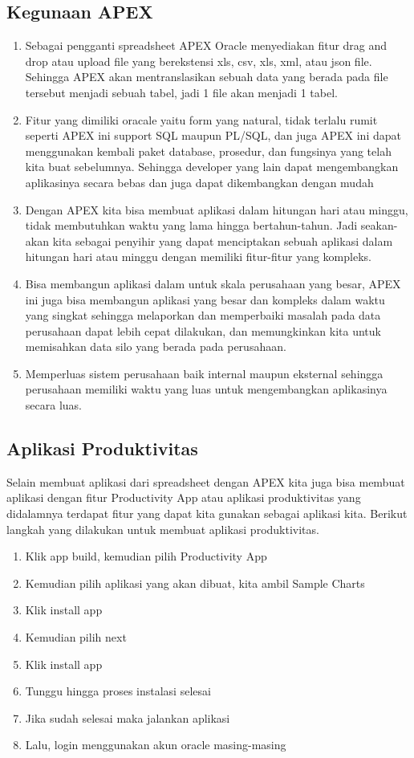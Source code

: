 \subsection{Kegunaan APEX}
\begin{enumerate}
\item Sebagai pengganti spreadsheet APEX Oracle menyediakan fitur drag and drop atau upload file yang berekstensi xls, csv, xls, xml, atau json file. Sehingga APEX akan mentranslasikan sebuah data yang berada pada file tersebut menjadi sebuah tabel, jadi 1 file akan menjadi 1 tabel.
\item Fitur yang dimiliki oracale yaitu form yang natural, tidak terlalu rumit seperti APEX ini support SQL maupun PL/SQL, dan juga APEX ini dapat menggunakan kembali paket database, prosedur, dan fungsinya yang telah kita buat sebelumnya. Sehingga developer yang lain dapat mengembangkan aplikasinya secara bebas dan juga dapat dikembangkan dengan mudah
\item Dengan APEX kita bisa membuat aplikasi dalam hitungan hari atau minggu, tidak membutuhkan waktu yang lama hingga bertahun-tahun. Jadi seakan-akan kita sebagai penyihir yang dapat menciptakan sebuah aplikasi dalam hitungan hari atau minggu dengan memiliki fitur-fitur yang kompleks.
\item Bisa membangun aplikasi dalam untuk skala perusahaan yang besar, APEX ini juga bisa membangun aplikasi yang besar dan kompleks dalam waktu yang singkat sehingga melaporkan dan memperbaiki masalah pada data perusahaan dapat lebih cepat dilakukan, dan memungkinkan kita untuk memisahkan data silo yang berada pada perusahaan.
\item Memperluas sistem perusahaan baik internal maupun eksternal sehingga perusahaan memiliki waktu yang luas untuk mengembangkan aplikasinya secara luas.
\end{enumerate}

\subsection{Aplikasi Produktivitas}
Selain membuat aplikasi dari spreadsheet dengan APEX kita juga bisa membuat aplikasi dengan fitur Productivity App atau aplikasi produktivitas yang didalamnya terdapat fitur yang dapat kita gunakan sebagai aplikasi kita. Berikut langkah yang dilakukan untuk membuat aplikasi produktivitas.
\begin{enumerate}
\item Klik app build, kemudian pilih Productivity App
\item Kemudian pilih aplikasi yang akan dibuat, kita ambil Sample Charts
\item Klik install app
\item Kemudian pilih next
\item Klik install app
\item Tunggu hingga proses instalasi selesai
\item Jika sudah selesai maka jalankan aplikasi
\item Lalu, login menggunakan akun oracle masing-masing
\end{enumerate}